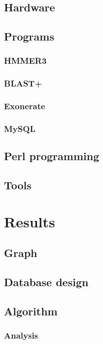 \documentclass[a4paper,12pt]{scrreprt}
\begin{document}
	\section{Hardware}
		
	\section{Programs}
		
		\subsection{HMMER3}
			
		\subsection{BLAST+}
			
		\subsection{Exonerate}
			
		\subsection{MySQL}
			
	\section{Perl programming}
		
	\section{Tools}
		

\chapter{Results}
	
	\section{Graph}
		
	\section{Database design}
		
	\section{Algorithm}
		\subsection{Analysis}
			
\end{document}
